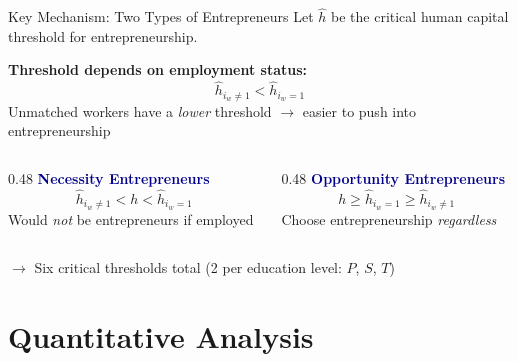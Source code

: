 \documentclass[aspectratio=169, 11pt]{beamer}
\begin{document}
\begin{frame}{Key Mechanism: Two Types of Entrepreneurs}
    Let $\hat{h}$ be the critical human capital threshold for entrepreneurship.

    \vspace{0.5em}

    \textbf{Threshold depends on employment status:}
    \[
        \hat{h}_{i_w \neq 1} < \hat{h}_{i_w = 1}
    \]
    Unmatched workers have a \textit{lower} threshold $\rightarrow$ easier to push into entrepreneurship

    \vspace{1em}

    \begin{columns}[T]
        \begin{column}{0.48\textwidth}
            \textbf{\textcolor{darkblue}{Necessity Entrepreneurs}}
            \[
                \hat{h}_{i_w \neq 1} < h < \hat{h}_{i_w = 1}
            \]
            Would \textit{not} be entrepreneurs if employed
        \end{column}
        \begin{column}{0.48\textwidth}
            \textbf{\textcolor{darkblue}{Opportunity Entrepreneurs}}
            \[
                h \geq \hat{h}_{i_w = 1} \geq \hat{h}_{i_w \neq 1}
            \]
            Choose entrepreneurship \textit{regardless}
        \end{column}
    \end{columns}

    \vspace{0.8em}

    $\rightarrow$ Six critical thresholds total (2 per education level: $P$, $S$, $T$)
\end{frame}


\section{Quantitative Analysis}

\end{document}
